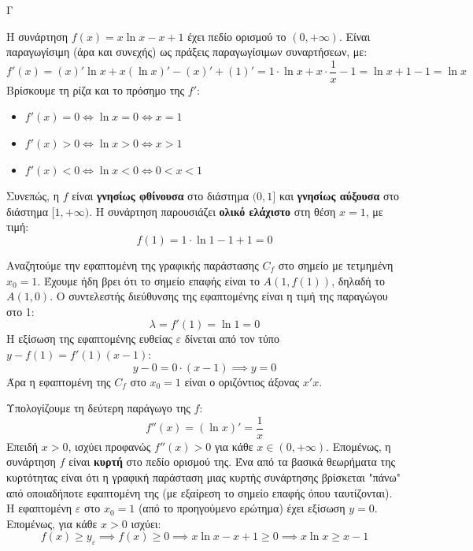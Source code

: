 \begin{thema}{Γ}
\begin{erwthma}
\item Η συνάρτηση $f(x) = x \ln x - x + 1$ έχει πεδίο ορισμού το $(0, +\infty)$. Είναι παραγωγίσιμη (άρα και συνεχής) ως πράξεις παραγωγίσιμων συναρτήσεων, με:
\[ f'(x) = (x)' \ln x + x (\ln x)' - (x)' + (1)' = 1 \cdot \ln x + x \cdot \frac{1}{x} - 1 = \ln x + 1 - 1 = \ln x \]
Βρίσκουμε τη ρίζα και το πρόσημο της $f'$:
\begin{itemize}
    \item $f'(x) = 0 \Leftrightarrow \ln x = 0 \Leftrightarrow x = 1$
    \item $f'(x) > 0 \Leftrightarrow \ln x > 0 \Leftrightarrow x > 1$
    \item $f'(x) < 0 \Leftrightarrow \ln x < 0 \Leftrightarrow 0 < x < 1$
\end{itemize}
\begin{center}
\end{center}
Συνεπώς, η $f$ είναι \textbf{γνησίως φθίνουσα} στο διάστημα $(0, 1]$ και \textbf{γνησίως αύξουσα} στο διάστημα $[1, +\infty)$.
Η συνάρτηση παρουσιάζει \textbf{ολικό ελάχιστο} στη θέση $x = 1$, με τιμή:
\[ f(1) = 1 \cdot \ln 1 - 1 + 1 = 0 \]

\item Αναζητούμε την εφαπτομένη της γραφικής παράστασης $C_f$ στο σημείο με τετμημένη $x_0 = 1$.
Έχουμε ήδη βρει ότι το σημείο επαφής είναι το $A(1, f(1))$, δηλαδή το $A(1, 0)$.
Ο συντελεστής διεύθυνσης της εφαπτομένης είναι η τιμή της παραγώγου στο 1:
\[ \lambda = f'(1) = \ln 1 = 0 \]
Η εξίσωση της εφαπτομένης ευθείας $\varepsilon$ δίνεται από τον τύπο $y - f(1) = f'(1)(x - 1)$:
\[ y - 0 = 0 \cdot (x - 1) \implies y = 0 \]
Άρα η εφαπτομένη της $C_f$ στο $x_0=1$ είναι ο οριζόντιος άξονας $x'x$.

\item Υπολογίζουμε τη δεύτερη παράγωγο της $f$:
\[ f''(x) = (\ln x)' = \frac{1}{x} \]
Επειδή $x > 0$, ισχύει προφανώς $f''(x) > 0$ για κάθε $x \in (0, +\infty)$. Επομένως, η συνάρτηση $f$ είναι \textbf{κυρτή} στο πεδίο ορισμού της.
Ένα από τα βασικά θεωρήματα της κυρτότητας είναι ότι η γραφική παράσταση μιας κυρτής συνάρτησης βρίσκεται "πάνω" από οποιαδήποτε εφαπτομένη της (με εξαίρεση το σημείο επαφής όπου ταυτίζονται). 
Η εφαπτομένη $\varepsilon$ στο $x_0=1$ (από το προηγούμενο ερώτημα) έχει εξίσωση $y=0$. Επομένως, για κάθε $x > 0$ ισχύει:
\[ f(x) \ge y_{\varepsilon} \implies f(x) \ge 0 \implies x \ln x - x + 1 \ge 0 \implies x \ln x \ge x - 1 \]


\end{erwthma}
\end{thema}
